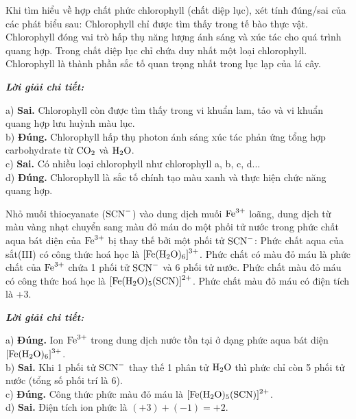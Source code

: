 \documentclass[11pt,a4paper]{article}
\def\loigiai#1{
\par\begingroup\color{blue!80!black}\small
\noindent\textbf{\textit{Lời giải chi tiết:}}\par
#1\par\endgroup}
\begin{document}
\begin{ex}
 Khi tìm hiểu về hợp chất phức chlorophyll (chất diệp lục), xét tính đúng/sai của các phát biểu sau:
\choiceTF
{Chlorophyll chỉ được tìm thấy trong tế bào thực vật.}
{\True Chlorophyll đóng vai trò hấp thụ năng lượng ánh sáng và xúc tác cho quá trình quang hợp.}
{Trong chất diệp lục chỉ chứa duy nhất một loại chlorophyll.}
{\True Chlorophyll là thành phần sắc tố quan trọng nhất trong lục lạp của lá cây.}
\loigiai{
a) \textbf{Sai.} Chlorophyll còn được tìm thấy trong vi khuẩn lam, tảo và vi khuẩn quang hợp lưu huỳnh màu lục.\\
b) \textbf{Đúng.} Chlorophyll hấp thụ photon ánh sáng xúc tác phản ứng tổng hợp carbohydrate từ $\ce{CO2}$ và $\ce{H2O}$.\\
c) \textbf{Sai.} Có nhiều loại chlorophyll như chlorophyll a, b, c, d...\\
d) \textbf{Đúng.} Chlorophyll là sắc tố chính tạo màu xanh và thực hiện chức năng quang hợp.
}
\end{ex}

\begin{ex}
 Nhỏ muối thiocyanate ($\ce{SCN-}$) vào dung dịch muối $\ce{Fe^3+}$ loãng, dung dịch từ màu vàng nhạt chuyển sang màu đỏ máu do một phối tử nước trong phức chất aqua bát diện của $\ce{Fe^3+}$ bị thay thế bởi một phối tử $\ce{SCN-}$:
\choiceTF
{\True Phức chất aqua của sắt(III) có công thức hoá học là $\ce{[Fe(H2O)6]^3+}$.}
{Phức chất có màu đỏ máu là phức chất của $\ce{Fe^3+}$ chứa 1 phối tử $\ce{SCN-}$ và 6 phối tử nước.}
{\True Phức chất màu đỏ máu có công thức hoá học là $\ce{[Fe(H2O)5(SCN)]^2+}$.}
{Phức chất màu đỏ máu có điện tích là +3.}
\loigiai{
a) \textbf{Đúng.} Ion $\ce{Fe^3+}$ trong dung dịch nước tồn tại ở dạng phức aqua bát diện $\ce{[Fe(H2O)6]^3+}$.\\
b) \textbf{Sai.} Khi 1 phối tử $\ce{SCN-}$ thay thế 1 phân tử $\ce{H2O}$ thì phức chỉ còn 5 phối tử nước (tổng số phối trí là 6).\\
c) \textbf{Đúng.} Công thức phức màu đỏ máu là $\ce{[Fe(H2O)5(SCN)]^2+}$.\\
d) \textbf{Sai.} Điện tích ion phức là $(+3) + (-1) = +2$.
}
\end{ex}
\end{document}

